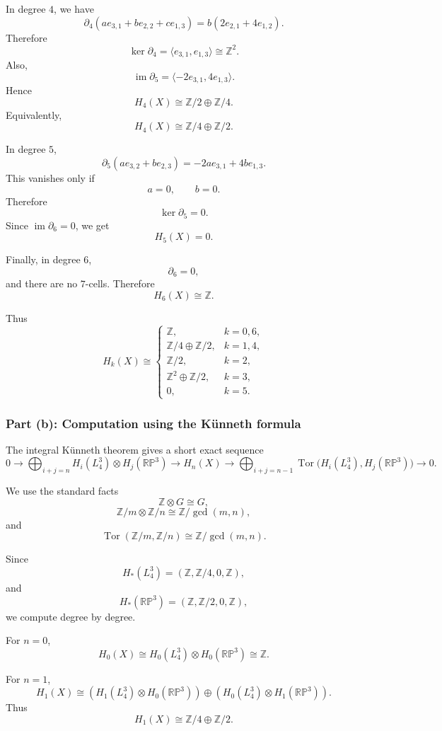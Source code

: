 \documentclass[12pt,a4paper]{article}
\theoremstyle{notespace}
\begin{document}
In degree \(4\), we have
\[
\partial_4(ae_{3,1}+be_{2,2}+ce_{1,3})
=
b(2e_{2,1}+4e_{1,2}).
\]
Therefore
\[
\ker \partial_4
=
\langle e_{3,1},e_{1,3}\rangle
\cong \mathbb Z^2.
\]
Also,
\[
\operatorname{im}\partial_5
=
\langle -2e_{3,1},4e_{1,3}\rangle.
\]
Hence
\[
H_4(X)
\cong
\mathbb Z/2\oplus \mathbb Z/4.
\]
Equivalently,
\[
H_4(X)\cong \mathbb Z/4\oplus \mathbb Z/2.
\]

In degree \(5\),
\[
\partial_5(ae_{3,2}+be_{2,3})
=
-2a e_{3,1}+4b e_{1,3}.
\]
This vanishes only if
\[
a=0,
\qquad
b=0.
\]
Therefore
\[
\ker \partial_5=0.
\]
Since \(\operatorname{im}\partial_6=0\), we get
\[
H_5(X)=0.
\]

Finally, in degree \(6\),
\[
\partial_6=0,
\]
and there are no \(7\)-cells. Therefore
\[
H_6(X)\cong \mathbb Z.
\]

Thus
\[
\boxed{
	H_k(X)\cong
	\begin{cases}
		\mathbb Z, & k=0,6,\\[1mm]
		\mathbb Z/4\oplus \mathbb Z/2, & k=1,4,\\[1mm]
		\mathbb Z/2, & k=2,\\[1mm]
		\mathbb Z^2\oplus \mathbb Z/2, & k=3,\\[1mm]
		0, & k=5.
\end{cases}}
\]

\subsubsection{Part (b): Computation using the Künneth formula}

The integral Künneth theorem gives a short exact sequence
\[
0
\longrightarrow
\bigoplus_{i+j=n}
H_i(L_4^3)\otimes H_j(\mathbb{RP}^3)
\longrightarrow
H_n(X)
\longrightarrow
\bigoplus_{i+j=n-1}
\operatorname{Tor}\bigl(H_i(L_4^3),H_j(\mathbb{RP}^3)\bigr)
\longrightarrow
0.
\]

We use the standard facts
\[
\mathbb Z\otimes G\cong G,
\]
\[
\mathbb Z/m\otimes \mathbb Z/n\cong \mathbb Z/\gcd(m,n),
\]
and
\[
\operatorname{Tor}(\mathbb Z/m,\mathbb Z/n)
\cong
\mathbb Z/\gcd(m,n).
\]

Since
\[
H_*(L_4^3)
=
(\mathbb Z,\mathbb Z/4,0,\mathbb Z),
\]
and
\[
H_*(\mathbb{RP}^3)
=
(\mathbb Z,\mathbb Z/2,0,\mathbb Z),
\]
we compute degree by degree.

For \(n=0\),
\[
H_0(X)
\cong
H_0(L_4^3)\otimes H_0(\mathbb{RP}^3)
\cong
\mathbb Z.
\]

For \(n=1\),
\[
H_1(X)
\cong
(H_1(L_4^3)\otimes H_0(\mathbb{RP}^3))
\oplus
(H_0(L_4^3)\otimes H_1(\mathbb{RP}^3)).
\]
Thus
\[
H_1(X)
\cong
\mathbb Z/4\oplus \mathbb Z/2.
\]
\end{document}
